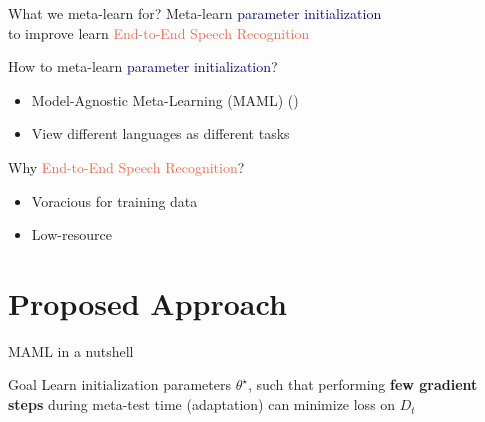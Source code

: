 \documentclass{beamer}
\begin{document}
\begin{frame}[t]{What we meta-learn for?}
  \centering Meta-learn \textcolor{navy}{parameter initialization} \\ to improve learn \textcolor{tomato}{End-to-End Speech Recognition}

  \pause
  \flushleft How to meta-learn \textcolor{navy}{parameter initialization}?
  \begin{itemize}
    \item Model-Agnostic Meta-Learning (MAML) (\citealt{finn2017model})
    \item View different languages as different tasks
  \end{itemize}

  \pause

  Why \textcolor{tomato}{End-to-End Speech Recognition}?
  \begin{itemize}
    \item Voracious for training data
    \item Low-resource 
  \end{itemize}
\end{frame}

\section{Proposed Approach}
\begin{frame}[t]{MAML in a nutshell}
  \begin{block}{Goal}
    Learn initialization parameters $\theta^\star$, such that performing \textbf{few gradient steps} during meta-test time (adaptation) can minimize loss on $D_t$
  \end{block}
  \flushright \hyperlink{overview of maml}{}
\end{frame}
\end{document}
